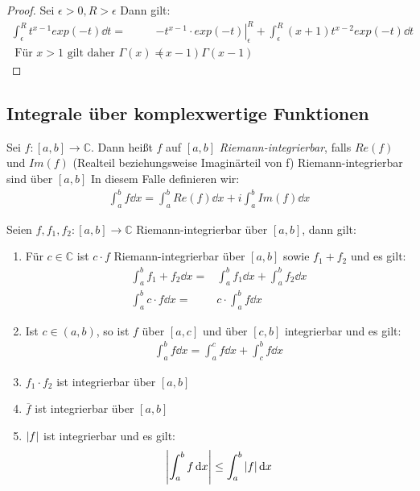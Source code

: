 \begin{proof}
	Sei $\epsilon > 0, R > \epsilon$ Dann gilt:
	\begin{align*}
		\int_{\epsilon}^{R}t^{x-1} exp(-t) \dd{t}  = & 
			\left. -t^{x-1} \cdot exp(-t) \right\vert_{\epsilon}^R 
			+ \int_{\epsilon}^{R}(x+1)t^{x-2}exp(-t) \dd{t} \\
			\text{ Für } x > 1 \text{ gilt daher }
			\Gamma(x) = &  (x-1) \Gamma(x-1)
	\end{align*}
\end{proof}

\subsection{Integrale über komplexwertige Funktionen}

\begin{Definition}{
	Sei $f: [a,b] \rightarrow \mathbb{C}$. Dann heißt $f$ auf $[a,b]$ 
	\emph{Riemann-integrierbar}, falls $Re(f)$ und $Im(f)$ (Realteil beziehungsweise 
	Imaginärteil von f) Riemann-integrierbar sind über $[a,b]$ In diesem Falle 
	definieren wir:
	\begin{align*}
		\int_a^b f \dd{x} = \int_a^b Re(f) \dd{x} + i \int_a^b Im(f) \dd{x}
	\end{align*}
}\end{Definition}

\begin{Satz}{
	Seien $f, f_1, f_2: [a,b] \rightarrow \mathbb{C}$ Riemann-integrierbar über 
	$[a,b]$, dann gilt:
	\renewcommand{\labelenumi}{\alph{enumi})}
	\begin{enumerate}
		\item Für $c \in \mathbb{C}$ ist $c \cdot f$ Riemann-integrierbar über 
		$[a,b]$ sowie $f_1 + f_2$ und es gilt:
		\begin{align*}
			\int_a^b f_1 + f_2 \dd{x} = &\int_a^b f_1 \dd{x} + \int_a^b f_2 \dd{x}\\
			\int_a^b c \cdot f \dd{x} = & c \cdot \int_a^b f \dd{x} 
		\end{align*}
		\item Ist $ c \in (a,b)$, so ist $f$ über $[a,c]$ und über $[c,b]$ 
		integrierbar und es gilt:
		\begin{align*}
			\int_a^b f \dd{x} = \int_a^c f \dd{x} + \int_c^b f \dd{x}
		\end{align*}
		\item $f_1 \cdot f_2$ ist integrierbar über $[a,b]$
		\item $\overline{f}$ ist integrierbar über $[a,b]$
		\item $\abs{f}$ ist integrierbar und es gilt:
		\begin{align*}
			\abs{\int_a^b f \dd{x} } \leq \int_a^b \abs{f} \dd{x}
		\end{align*}
	\end{enumerate}
}\end{Satz}

